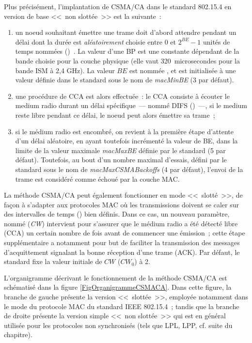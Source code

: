 Plus précisément, l'implantation de CSMA/CA dans le standard 802.15.4
en version de base <<~non slottée~>> est la suivante~:

\begin{enumerate}

\item un noeud souhaitant émettre une trame doit d'abord attendre pendant
un délai dont la durée est \emph{aléatoirement} choisie entre 0 et
$2^{BE} - 1$ unités de temps nommées  ()~.
La valeur d'une BP est une constante dépendant de la bande choisie pour
la couche physique (elle vaut 320~microsecondes pour la bande ISM à 2,4 GHz).
La valeur $BE$ est nommée , et est initialisée
à une valeur définie dans le standard sous le nom de \emph{macMinBE}
(3 par défaut).

\item une procédure de CCA est alors effectuée~: le CCA consiste à écouter
le medium radio durant un délai spécifique~--- nommé DIFS
()~---, si le medium reste libre
pendant ce délai, le noeud peut alors émettre sa trame~; 

\item si le médium radio est encombré, on revient à la première étape
d'attente d'un délai aléatoire, en ayant toutefois incrémenté la valeur
de BE, dans la limite de la valeur maximale \emph{macMaxBE} définie
par le standard (5 par défaut). Toutefois, au bout d'un nombre maximal
d'essais, défini par le standard sous le nom de \emph{macMaxCSMABackoffs}
(4 par défaut), l'envoi de la trame est considéré comme échoué par la
couche MAC.

\end{enumerate}

La méthode CSMA/CA peut également fonctionner en mode <<~slotté~>>, de
façon à s'adapter aux protocoles MAC où les transmissions doivent se caler
sur des intervalles de temps () bien définis. Dans ce cas,
un nouveau paramètre, nommé  (\emph{CW})
intervient pour s'assurer que le médium radio a été détecté libre (CCA)
un certain nombre de fois avant de commencer une émission~; cette étape
supplémentaire a notamment pour but de faciliter la transmission des
messages d'acquittement signalant la bonne réception d'une trame (ACK).
Par défaut, le standard fixe la valeur initiale de $CW$ ($CW_0$) à 2.

L'organigramme décrivant le fonctionnement de la méthode CSMA/CA est
schématisé dans la figure \vref{FigOrganigrammeCSMACA}.
Dans cette figure, la branche de gauche présente la version <<~slottée~>>,
employée notamment dans le mode  du protocole MAC du
standard IEEE 802.15.4~; tandis que la branche de droite présente la
version simple <<~non slottée~>> qui est en général utilisée pour les
protocoles non synchronisés (tels que LPL, LPP, cf. suite du chapitre).


